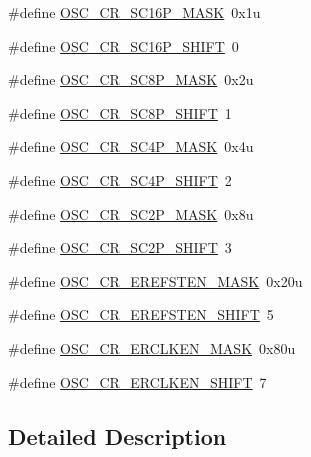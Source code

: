 \begin{DoxyCompactItemize}
\item 
\#define \hyperlink{group___o_s_c___register___masks_ga8c73f0e22875a434f8031986a9e5f8b4}{O\+S\+C\+\_\+\+C\+R\+\_\+\+S\+C16\+P\+\_\+\+M\+A\+SK}~0x1u
\item 
\#define \hyperlink{group___o_s_c___register___masks_ga4bcf6535cd7e7c4ff935f6b544ca3f9a}{O\+S\+C\+\_\+\+C\+R\+\_\+\+S\+C16\+P\+\_\+\+S\+H\+I\+FT}~0
\item 
\#define \hyperlink{group___o_s_c___register___masks_ga1a5a0db08efaf66c34caf98136cbec11}{O\+S\+C\+\_\+\+C\+R\+\_\+\+S\+C8\+P\+\_\+\+M\+A\+SK}~0x2u
\item 
\#define \hyperlink{group___o_s_c___register___masks_ga6f17376a1571a200e55cac51d1358503}{O\+S\+C\+\_\+\+C\+R\+\_\+\+S\+C8\+P\+\_\+\+S\+H\+I\+FT}~1
\item 
\#define \hyperlink{group___o_s_c___register___masks_ga18f4104a5a6c0d94f0592ee06732fe03}{O\+S\+C\+\_\+\+C\+R\+\_\+\+S\+C4\+P\+\_\+\+M\+A\+SK}~0x4u
\item 
\#define \hyperlink{group___o_s_c___register___masks_gab1724a5b1e96efb22e48a9478ae8cf25}{O\+S\+C\+\_\+\+C\+R\+\_\+\+S\+C4\+P\+\_\+\+S\+H\+I\+FT}~2
\item 
\#define \hyperlink{group___o_s_c___register___masks_ga94a8b0e48d18793bde1a3aaaea44b92c}{O\+S\+C\+\_\+\+C\+R\+\_\+\+S\+C2\+P\+\_\+\+M\+A\+SK}~0x8u
\item 
\#define \hyperlink{group___o_s_c___register___masks_ga0ec9adaf1ca3ec309f1a2c2fd37d3f4d}{O\+S\+C\+\_\+\+C\+R\+\_\+\+S\+C2\+P\+\_\+\+S\+H\+I\+FT}~3
\item 
\#define \hyperlink{group___o_s_c___register___masks_ga3024913f44011d333c6f48ddb00fbf9d}{O\+S\+C\+\_\+\+C\+R\+\_\+\+E\+R\+E\+F\+S\+T\+E\+N\+\_\+\+M\+A\+SK}~0x20u
\item 
\#define \hyperlink{group___o_s_c___register___masks_gac1b9c5d7f156f1792255204dae816aba}{O\+S\+C\+\_\+\+C\+R\+\_\+\+E\+R\+E\+F\+S\+T\+E\+N\+\_\+\+S\+H\+I\+FT}~5
\item 
\#define \hyperlink{group___o_s_c___register___masks_gab96140627de270278cbdfc81fbef63fc}{O\+S\+C\+\_\+\+C\+R\+\_\+\+E\+R\+C\+L\+K\+E\+N\+\_\+\+M\+A\+SK}~0x80u
\item 
\#define \hyperlink{group___o_s_c___register___masks_ga56f4aa6f215268327accda5434671187}{O\+S\+C\+\_\+\+C\+R\+\_\+\+E\+R\+C\+L\+K\+E\+N\+\_\+\+S\+H\+I\+FT}~7
\end{DoxyCompactItemize}


\subsection{Detailed Description}


